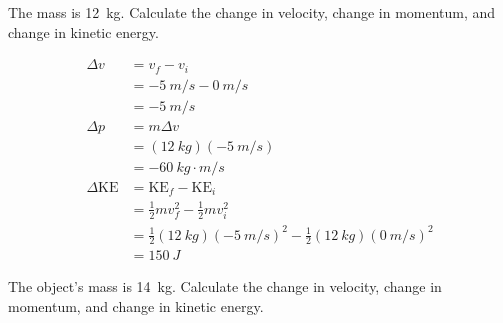 \documentclass[../main-physics-problems.tex]{subfiles}
\begin{document}
\begin{questions}
\ifprintanswers
    \clearpage
\fi

\question
The mass is \SI{12}{kg}. Calculate the change in velocity, change in momentum, and change in kinetic energy. 

\begin{center}
\end{center}


\begin{solution}
\begin{align*}
    \Delta v &= v_f - v_i \\[1ex]
    &= \SI{-5}{m/s} - \SI{0}{m/s} \\[1ex]
    &= \boxed{\SI{-5}{m/s}} \\[2ex]
    \Delta p &= m \Delta v \\[1ex]
    &= (\SI{12}{kg})(\SI{-5}{m/s}) \\[1ex]
    &= \boxed{\SI{-60}{kg\cdot m/s}} \\[2ex]
    \Delta \mathrm{KE} &= \mathrm{KE}_f - \mathrm{KE}_i \\[1ex]
    &= \frac{1}{2}m v_f^2 - \frac{1}{2}mv_i^2 \\[1ex]
    &= \frac{1}{2}(\SI{12}{kg})(\SI{-5}{m/s})^2 - \frac{1}{2}(\SI{12}{kg}) (\SI{0}{m/s})^2 \\[1ex]
    &= \boxed{\SI{150}{J}}
\end{align*}
\end{solution}

\ifprintanswers
    \clearpage
\fi

\question
The object's mass is \SI{14}{kg}. Calculate the change in velocity, change in momentum, and change in kinetic energy.

\begin{center}
\end{center}


\end{questions}
\end{document}

